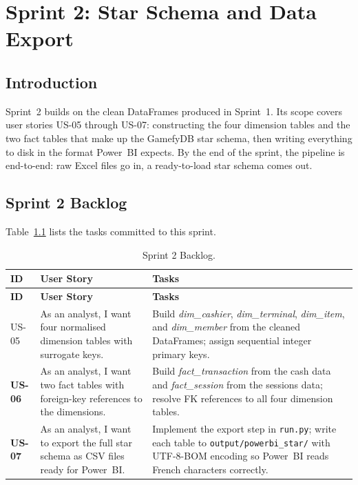 
\chapter{Sprint 2: Star Schema and Data Export}

\section{Introduction}

Sprint~2 builds on the clean DataFrames produced in Sprint~1. Its scope covers user
stories US-05 through US-07: constructing the four dimension tables and the two fact
tables that make up the GamefyDB star schema, then writing everything to disk in the
format Power~BI expects. By the end of the sprint, the pipeline is end-to-end: raw
Excel files go in, a ready-to-load star schema comes out.

\section{Sprint 2 Backlog}

Table~\ref{tab:sprint2_backlog} lists the tasks committed to this sprint.

\begin{longtable}{>{\bfseries}p{1.3cm} p{4.2cm} p{7cm}}
  \caption{Sprint 2 Backlog.\label{tab:sprint2_backlog}} \\
  \toprule
  \textbf{ID} & \textbf{User Story} & \textbf{Tasks} \\
  \midrule
  \endfirsthead
  \toprule
  \textbf{ID} & \textbf{User Story} & \textbf{Tasks} \\
  \midrule
  \endhead
  \bottomrule
  \endfoot

  US-05 & As an analyst, I want four normalised dimension tables with surrogate keys.
        & Build \textit{dim\_cashier}, \textit{dim\_terminal}, \textit{dim\_item},
          and \textit{dim\_member} from the cleaned DataFrames; assign sequential
          integer primary keys. \\[4pt]

  US-06 & As an analyst, I want two fact tables with foreign-key references to the
          dimensions.
        & Build \textit{fact\_transaction} from the cash data and
          \textit{fact\_session} from the sessions data; resolve FK references to
          all four dimension tables. \\[4pt]

  US-07 & As an analyst, I want to export the full star schema as CSV files ready
          for Power~BI.
        & Implement the export step in \texttt{run.py}; write each table to
          \texttt{output/powerbi\_star/} with UTF-8-BOM encoding so Power~BI
          reads French characters correctly. \\
\end{longtable}

